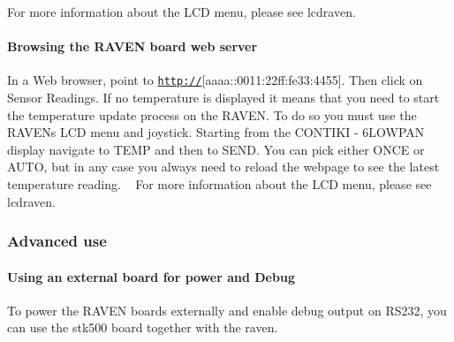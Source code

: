 For more information about the L\+CD menu, please see lcdraven.\hypertarget{a00072_running_browse}{}\paragraph{Browsing the R\+A\+V\+E\+N board web server}\label{a00072_running_browse}
In a Web browser, point to \href{http://}{\tt http\+://}\mbox{[}aaaa\+:\+:0011\+:22ff\+:fe33\+:4455\mbox{]}. Then click on \textquotesingle{}Sensor Readings\textquotesingle{}. If no temperature is displayed it means that you need to start the temperature update process on the R\+A\+V\+EN. To do so you must use the R\+A\+V\+EN\textquotesingle{}s L\+CD menu and joystick. Starting from the C\+O\+N\+T\+I\+KI -\/ 6\+L\+O\+W\+P\+AN display navigate to T\+E\+MP and then to S\+E\+ND. You can pick either O\+N\+CE or A\+U\+TO, but in any case you always need to reload the webpage to see the latest temperature reading. ~\newline
 For more information about the L\+CD menu, please see lcdraven.



 \hypertarget{a00072_advanced}{}\subsubsection{Advanced use}\label{a00072_advanced}
\hypertarget{a00072_advanced_externalboard}{}\paragraph{Using an external board for power and Debug}\label{a00072_advanced_externalboard}
To power the R\+A\+V\+EN boards externally and enable debug output on R\+S232, you can use the stk500 board together with the raven.

